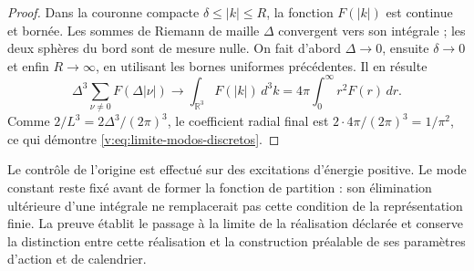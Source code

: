 \begin{proof}
Dans la couronne compacte \(\delta\leq|k|\leq R\), la fonction
\(F(|k|)\) est continue et bornée. Les sommes de Riemann de maille
\(\Delta\) convergent vers son intégrale ; les deux sphères du bord
sont de mesure nulle. On fait d’abord \(\Delta\to0\), ensuite
\(\delta\to0\) et enfin \(R\to\infty\), en utilisant les bornes
uniformes précédentes. Il en résulte
\[
 \Delta^3\sum_{\nu\ne0}F(\Delta|\nu|)
 \longrightarrow \int_{\mathbb R^3}F(|k|)\,d^3k
 =4\pi\int_0^\infty r^2F(r)\,dr.
\]
Comme \(2/L^3=2\Delta^3/(2\pi)^3\), le coefficient radial final
est \(2\cdot4\pi/(2\pi)^3=1/\pi^2\), ce qui démontre
\eqref{v:eq:limite-modos-discretos}.
\end{proof}

Le contrôle de l’origine est effectué sur des excitations d’énergie positive.
Le mode constant reste fixé avant de former la fonction de partition :
son élimination ultérieure d’une intégrale ne remplacerait pas cette condition de
la représentation finie. La preuve établit le passage à la limite de la
réalisation déclarée et conserve la distinction entre cette réalisation et
la construction préalable de ses paramètres d’action et de calendrier.
